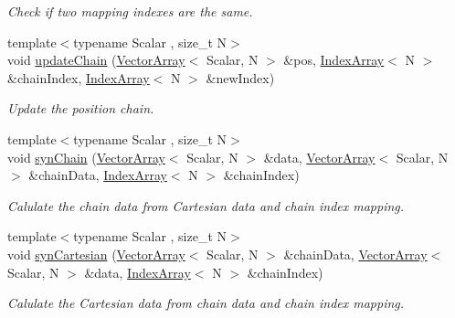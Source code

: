 \begin{DoxyCompactItemize}
\begin{DoxyCompactList}\small\item\em Check if two mapping indexes are the same. \end{DoxyCompactList}\item 
{\footnotesize template$<$typename Scalar , size\+\_\+t N$>$ }\\void \mbox{\hyperlink{namespacechain_a36c1d242033be6243c1cff525f818724}{update\+Chain}} (\mbox{\hyperlink{namespacechain_aa715d2f046187ea9f0c3ea55605d6214}{Vector\+Array}}$<$ Scalar, N $>$ \&pos, \mbox{\hyperlink{namespacechain_aa40d2da395c0ac2bc5f37832442ac403}{Index\+Array}}$<$ N $>$ \&chain\+Index, \mbox{\hyperlink{namespacechain_aa40d2da395c0ac2bc5f37832442ac403}{Index\+Array}}$<$ N $>$ \&new\+Index)
\begin{DoxyCompactList}\small\item\em Update the position chain. \end{DoxyCompactList}\item 
{\footnotesize template$<$typename Scalar , size\+\_\+t N$>$ }\\void \mbox{\hyperlink{namespacechain_abdcb44461ef66afb82d42ff5a441ed5c}{syn\+Chain}} (\mbox{\hyperlink{namespacechain_aa715d2f046187ea9f0c3ea55605d6214}{Vector\+Array}}$<$ Scalar, N $>$ \&data, \mbox{\hyperlink{namespacechain_aa715d2f046187ea9f0c3ea55605d6214}{Vector\+Array}}$<$ Scalar, N $>$ \&chain\+Data, \mbox{\hyperlink{namespacechain_aa40d2da395c0ac2bc5f37832442ac403}{Index\+Array}}$<$ N $>$ \&chain\+Index)
\begin{DoxyCompactList}\small\item\em Calulate the chain data from Cartesian data and chain index mapping. \end{DoxyCompactList}\item 
{\footnotesize template$<$typename Scalar , size\+\_\+t N$>$ }\\void \mbox{\hyperlink{namespacechain_ae85619534182ce257fc47857a9c133e4}{syn\+Cartesian}} (\mbox{\hyperlink{namespacechain_aa715d2f046187ea9f0c3ea55605d6214}{Vector\+Array}}$<$ Scalar, N $>$ \&chain\+Data, \mbox{\hyperlink{namespacechain_aa715d2f046187ea9f0c3ea55605d6214}{Vector\+Array}}$<$ Scalar, N $>$ \&data, \mbox{\hyperlink{namespacechain_aa40d2da395c0ac2bc5f37832442ac403}{Index\+Array}}$<$ N $>$ \&chain\+Index)
\begin{DoxyCompactList}\small\item\em Calulate the Cartesian data from chain data and chain index mapping. \end{DoxyCompactList}\end{DoxyCompactItemize}


